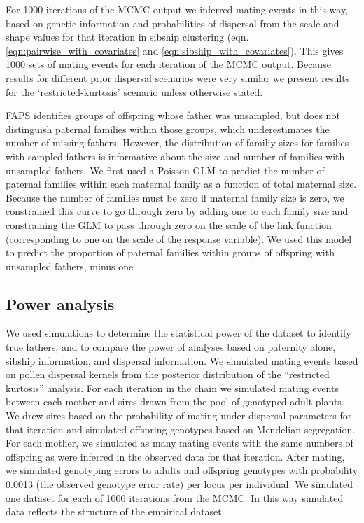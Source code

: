 \documentclass[10pt, a4paper, twocolumn]{article} %
\begin{document}
For 1000 iterations of the MCMC output we inferred mating events in this way, based on genetic information and probabilities of dispersal from the scale and shape values for that iteration in sibship clustering (eqn. \ref{eqn:pairwise_with_covariates} and \ref{eqn:sibship_with_covariates}). This gives 1000 sets of mating events for each iteration of the MCMC output. Because results for different prior dispersal scenarios were very similar we present results for the ‘restricted-kurtosis’ scenario unless otherwise stated.

FAPS identifies groups of offspring whose father was unsampled, but does not distinguish paternal families within those groups, which underestimates the number of missing fathers. However, the distribution of familiy sizes for families with sampled fathers is informative about the size and number of families with unsampled fathers. We first used a Poisson GLM to predict the number of paternal families within each maternal family as a function of total maternal size. Because the number of families must be zero if maternal family size is zero, we constrained this curve to go through zero by adding one to each family size and constraining the GLM to pass through zero on the scale of the link function (corresponding to one on the scale of the response variable). We used this model to predict the proportion of paternal families within groups of offspring with unsampled fathers, minus one

\subsection{Power analysis}

We used simulations to determine the statistical power of the dataset to identify true fathers, and to compare the power of analyses based on paternity alone, sibship information, and dispersal information. We simulated mating events based on pollen dispersal kernels from the posterior distribution of the “restricted kurtosis” analysis. For each iteration in the chain we simulated mating events between each mother and sires drawn from the pool of genotyped adult plants. We drew sires based on the probability of mating under dispersal parameters for that iteration and simulated offspring genotypes based on Mendelian segregation. For each mother, we simulated as many mating events with the same numbers of offspring as were inferred in the observed data for that iteration. After mating, we simulated genotyping errors to adults and offspring genotypes with probability 0.0013 (the observed genotype error rate) per locus per individual. We simulated one dataset for each of 1000 iterations from the MCMC. In this way simulated data reflects the structure of the empirical dataset.
\end{document}
